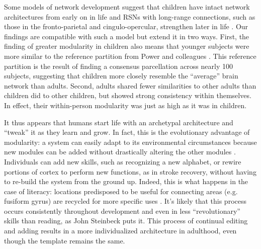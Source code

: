 Some models of network development suggest that children have intact network architectures from early on in life and RSNs with long-range connections, such as those in the fronto-parietal and cingulo-opercular, strengthen later in life \citep{Uddin2010, Cao2016}. Our findings are compatible with such a model but extend it in two ways. First, the finding of greater modularity in children also means that younger subjects were more similar to the reference partition from Power and colleagues \citep{Power2011}. This reference partition is the result of finding a consensus parcellation across nearly 100 subjects, suggesting that children more closely resemble the ``average'' brain network than adults. Second, adults shared fewer similarities to other adults than children did to other children, but showed strong consistency within themselves. In effect, their within-person modularity was just as high as it was in children.

It thus appears that humans start life with an archetypal architecture  and ``tweak'' it as they learn and grow. In fact, this is the evolutionary advantage of modularity: a system can easily adapt to its environmental circumstances because new modules can be added without drastically altering the other modules \citep{Kashtan2005}. Individuals can add new skills, such as recognizing a new alphabet, or rewire portions of cortex to perform new functions, as in stroke recovery, without having to re-build the system from the ground up. Indeed, this is what happens in the case of literacy: locations predisposed to be useful for connecting areas (e.g. fusiform gyrus) are recycled for more specific uses \citep{Saygin2016}. It's likely that this process occurs consistently throughout development and even in less ``revolutionary'' skills than reading, as John Steinbeck puts it. This process of continual editing and adding results in a more individualized architecture in adulthood, even though the template remains the same. 


